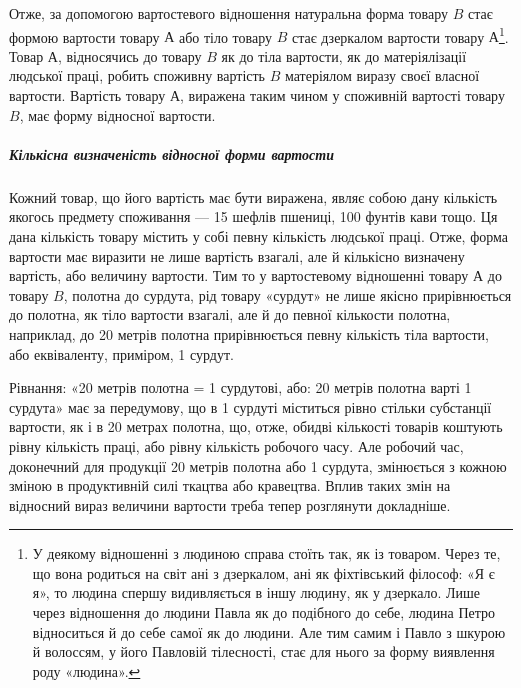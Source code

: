 Отже, за допомогою вартостевого відношення натуральна форма
товару $B$ стає формою вартости товару $А$ або тіло товару $B$
стає дзеркалом вартости товару $А$\footnote{
У деякому відношенні з людиною справа стоїть так, як із товаром.
Через те, що вона родиться на світ ані з дзеркалом, ані як фіхтівський
філософ: «Я є я», то людина спершу видивляється в іншу людину, як у
дзеркало. Лише через відношення до людини Павла як до подібного до
себе, людина Петро відноситься й до себе самої як до людини. Але тим
самим і Павло з шкурою й волоссям, у його Павловій тілесності, стає для
нього за форму виявлення роду «людина».
}. Товар $А$, відносячись до товару
$B$ як до тіла вартости, як до матеріялізації людської праці, робить
споживну вартість $B$ матеріялом виразу своєї власної вартости.
Вартість товару $А$, виражена таким чином у споживній
вартості товару $B$, має форму відносної вартости.

\subparagraph{Кількісна визначеність відносної форми вартости}

Кожний товар, що його вартість має бути виражена, являє собою
дану кількість якогось предмету споживання — 15 шефлів
пшениці, 100 фунтів кави тощо. Ця дана кількість товару містить
у собі певну кількість людської праці. Отже, форма вартости має
виразити не лише вартість взагалі, але й кількісно визначену
вартість, або величину вартости. Тим то у вартостевому відношенні
товару $А$ до товару $B$, полотна до сурдута, рід товару «сурдут»
не лише якісно прирівнюється до полотна, як тіло вартости
взагалі, але й до певної кількости полотна, наприклад, до 20 метрів
полотна прирівнюється певну кількість тіла вартости, або
еквіваленту, приміром, 1 сурдут.

Рівнання: «20 метрів полотна = 1 сурдутові, або: 20 метрів
полотна варті 1 сурдута» має за передумову, що в 1 сурдуті міститься
рівно стільки субстанції вартости, як і в 20 метрах полотна,
що, отже, обидві кількості товарів коштують рівну кількість
праці, або рівну кількість робочого часу. Але робочий час,
доконечний для продукції 20 метрів полотна або 1 сурдута, змінюється
з кожною зміною в продуктивній силі ткацтва або кравецтва.
Вплив таких змін на відносний вираз величини вартости
треба тепер розглянути докладніше.

